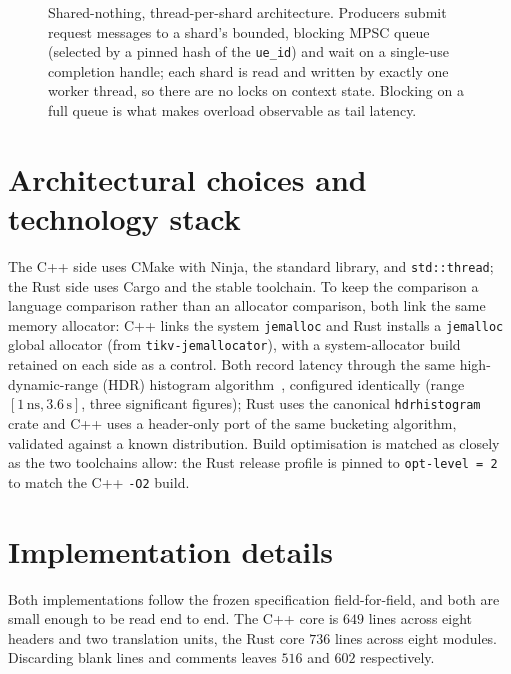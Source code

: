 \documentclass[english,twoside,openright,a4paper,censored,csm,software-track-2020]{HYthesisML}
\begin{document}
\begin{figure}
\caption[Shared-nothing, thread-per-shard architecture]{Shared-nothing, thread-per-shard architecture. Producers submit request messages to a
shard's bounded, blocking MPSC queue (selected by a pinned hash of the \texttt{ue\_id}) and wait
on a single-use completion handle; each shard is read and written by exactly one worker thread,
so there are no locks on context state. Blocking on a full queue is what makes overload
observable as tail latency.\label{fig:arch}}
\end{figure}

\section{Architectural choices and technology stack}
The C++ side uses CMake with Ninja, the standard library, and \texttt{std::thread}; the Rust
side uses Cargo and the stable toolchain. To keep the comparison a language comparison
rather than an allocator comparison, both link the same memory allocator: C++ links the
system \texttt{jemalloc} and Rust installs a \texttt{jemalloc} global allocator (from
\texttt{tikv-jemallocator}), with a system-allocator build retained on each side as a
control. Both record latency through the same high-dynamic-range (HDR) histogram
algorithm~\cite{tene_hdrhistogram}, configured identically (range $[1\,\text{ns},
3.6\,\text{s}]$, three significant figures); Rust uses the canonical \texttt{hdrhistogram}
crate and C++ uses a header-only port of the same bucketing algorithm, validated against a
known distribution. Build optimisation is matched as closely as the two toolchains allow:
the Rust release profile is pinned to \texttt{opt-level~=~2} to match the C++ \texttt{-O2}
build.

\section{Implementation details}\label{sec:impldetails}
\label{sec:impl}
Both implementations follow the frozen specification field-for-field, and both are small
enough to be read end to end. The C++ core is $649$ lines across eight headers and two
translation units, the Rust core $736$ lines across eight modules. Discarding blank lines and
comments leaves $516$ and $602$ respectively.
\end{document}
